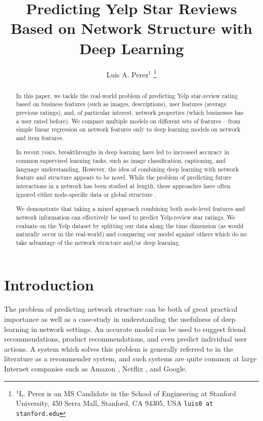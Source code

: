 \documentclass[letterpaper, 10 pt, conference]{ieeeconf}  %
\title{\LARGE \bf
Predicting Yelp Star Reviews Based on Network Structure with Deep Learning}
\author{Luis A. Perez$^{1}$%
\thanks{$^{1}$L. Perez is an MS Candidate in the School of Engineering at Stanford University,
        450 Serra Mall, Stanford, CA 94305, USA
        {\tt\small luis0 at stanford.edu}}%
}
\begin{document}
\maketitle
\thispagestyle{empty}
\pagestyle{empty}


\begin{abstract}

In this paper, we tackle the real-world problem of predicting Yelp star-review rating based on business features (such as images, descriptions), user features (average previous ratings), and, of particular interest, network properties (which businesses has a user rated before). We compare multiple models on different sets of features -- from simple linear regression on network features only to deep learning models on network and item features.

In recent years, breakthroughs in deep learning have led to increased accuracy in common supervised learning tasks, such as image classification, captioning, and language understanding. However, the idea of combining deep learning with network feature and structure appears to be novel. While the problem of predicting future interactions in a network has been studied at length, these approaches have often ignored either node-specific data or global structure \cite{PintrestProject}.

We demonstrate that taking a mixed approach combining both node-level features and network information can effectively be used to predict Yelp-review star ratings. We evaluate on the Yelp dataset by splitting our data along the time dimension (as would naturally occur in the real-world) and comparing our model against others which do no take advantage of the network structure and/or deep learning.

\end{abstract}


\section{Introduction}
The problem of predicting network structure can be both of great practical importance as well as a case-study in understanding the usefulness of deep learning in network settings. An accurate model can be used to suggest friend recommendations, product recommendations, and even predict individual user actions. A system which solves this problem is generally referred to in the literature as a recommender system, and such systems are quite common at large Internet companies such as Amazon \cite{Linden:2003:ARI:642462.642471}, Netflix \cite{Zhou:2008:LPC:1424237.1424269}, and Google.
\end{document}
